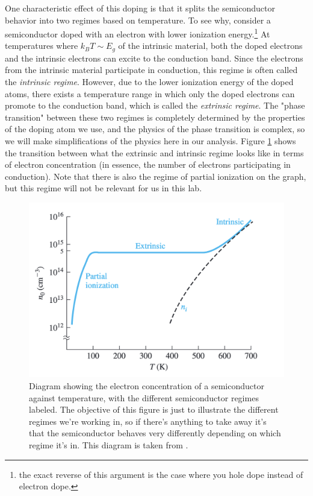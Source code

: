 \documentclass[10pt]{article}
\begin{document}
	One characteristic effect of this doping is that it splits the semiconductor behavior into two regimes
	based on temperature. To see why, consider a semiconductor doped with an electron with lower ionization
	energy.\footnote{the exact reverse of this argument is the case where you hole dope instead of electron
	dope.} At temperatures where \( k_BT \sim E_g \) of the intrinsic material, both the doped electrons and
	the intrinsic electrons can excite to the conduction band. 
	Since the electrons from the intrinsic
	material participate in conduction, this regime is often called the \textit{intrinsic regime}.  
	However, due to the lower ionization energy of
	the doped atoms, there exists a temperature range in which only the doped electrons can promote to the
	conduction band, which is called the \textit{extrinsic regime}. 
	The "phase transition" between these two
	regimes is completely determined by the properties of the doping atom we use, and the physics of the
	phase transition is complex, so we will make simplifications of the physics here in our analysis. 
	Figure \ref{regime-graph}
	shows the transition between what the extrinsic and intrinsic regime looks like in terms of electron
	concentration (in essence, the number of electrons participating in conduction). 
	Note that there is also the regime of partial ionization on the graph, but this regime
	will not be relevant for us in this lab.  

	\begin{figure}
		\centering
		\includegraphics[scale=0.5]{images/regime-graph.png}
		\caption{Diagram showing the electron concentration of a semiconductor against temperature, with the different
			semiconductor regimes labeled. The objective of this figure is just to illustrate the different
			regimes we're working in, so if there's anything to take away it's that the semiconductor behaves
		very differently depending on which regime it's in. This diagram is taken from \cite{neamen}.}
		\label{regime-graph}
	\end{figure}
\end{document}
